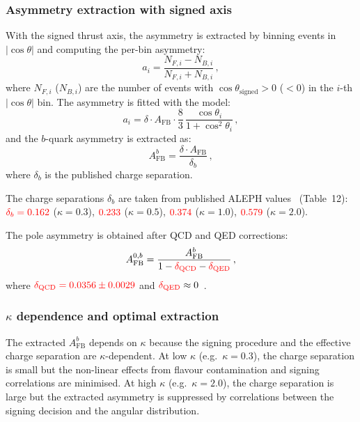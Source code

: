 \documentclass[11pt,a4paper]{article}
\newcommand{\external}[1]{\textcolor{red}{#1}}
\begin{document}
\subsubsection{Asymmetry extraction with signed axis}

With the signed thrust axis, the asymmetry is extracted by binning
events in $|\cos\theta|$ and computing the per-bin asymmetry:
\begin{equation}
a_i = \frac{N_{F,i} - N_{B,i}}{N_{F,i} + N_{B,i}}\,,
\label{eq:bin_asymmetry}
\end{equation}
where $N_{F,i}$ ($N_{B,i}$) are the number of events with
$\cos\theta_\text{signed} > 0$ ($< 0$) in the $i$-th
$|\cos\theta|$ bin.
The asymmetry is fitted with the model:
\begin{equation}
a_i = \delta \cdot A_\text{FB} \cdot
  \frac{8}{3}\,\frac{\cos\theta_i}{1 + \cos^2\theta_i}\,,
\label{eq:asymmetry_fit}
\end{equation}
and the $b$-quark asymmetry is extracted as:
\begin{equation}
A_\text{FB}^b = \frac{\delta \cdot A_\text{FB}}{\delta_b}\,,
\label{eq:afb_extraction}
\end{equation}
where $\delta_b$ is the published charge separation.

The charge separations $\delta_b$ are taken from published
ALEPH values~\cite{LEP:EWWG:2005} (Table~12):
$\external{\delta_b = 0.162}$ ($\kappa = 0.3$),
$\external{0.233}$ ($\kappa = 0.5$),
$\external{0.374}$ ($\kappa = 1.0$),
$\external{0.579}$ ($\kappa = 2.0$).

The pole asymmetry is obtained after QCD and QED corrections:
\begin{equation}
A_\text{FB}^{0,b} = \frac{A_\text{FB}^b}
  {1 - \external{\delta_\text{QCD}} - \external{\delta_\text{QED}}}\,,
\label{eq:afb_pole}
\end{equation}
where $\external{\delta_\text{QCD} = 0.0356 \pm 0.0029}$ and
$\external{\delta_\text{QED}} \approx 0$~\cite{LEP:EWWG:2005}.

\subsubsection{$\kappa$ dependence and optimal extraction}

The extracted $A_\text{FB}^b$ depends on $\kappa$ because the
signing procedure and the effective charge separation are
$\kappa$-dependent.
At low $\kappa$ (e.g.\ $\kappa = 0.3$), the charge separation is
small but the non-linear effects from flavour contamination and
signing correlations are minimised.
At high $\kappa$ (e.g.\ $\kappa = 2.0$), the charge separation is
large but the extracted asymmetry is suppressed by correlations
between the signing decision and the angular distribution.
\end{document}
